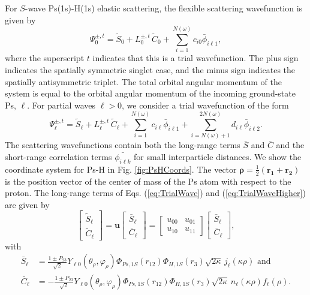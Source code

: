 \documentclass[preprint,showpacs,showkeys,preprintnumbers,amsmath,amssymb,longbibliography,pra,aps]{revtex4-1}
\begin{document}
For $S$-wave Ps(1s)-H(1s) elastic scattering, the flexible scattering
wavefunction is given by
\begin{equation}
\Psi_0^{\pm,t} = \widetilde{S}_0 + L_0^{\pm,t} \, \widetilde{C}_0
  + \sum_{i=1}^{N(\omega)} c_{i0} \bar{\phi}_{i\ell 1},
\label{eq:TrialWave}
\end{equation}
where the superscript $t$ indicates that this is a trial wavefunction. The plus
sign indicates the spatially symmetric singlet case, and the minus sign
indicates the spatially antisymmetric triplet. The total orbital angular
momentum of the system is equal to the orbital angular momentum of the incoming
ground-state Ps, $\ell$. For partial waves $\ell > 0$, we consider a trial
wavefunction of the form
\begin{equation}
\Psi_\ell^{\pm,t} = \widetilde{S}_\ell + L^{\pm,t}_\ell \, \widetilde{C}_\ell
 + \sum_{i=1}^{N(\omega)} c_{i\ell} \bar{\phi}_{i\ell 1}
 + \!\!\!\sum_{i=N(\omega)+1}^{2N(\omega)} \!\! d_{i\ell} \bar{\phi}_{i\ell 2}.
\label{eq:TrialWaveHigher}
\end{equation}
The scattering wavefunctions contain both the long-range terms $\bar{S}$ and
$\bar{C}$ and the short-range correlation terms $\bar{\phi_{i\ell k}}$ for
small interparticle distances. We show the coordinate system for Ps-H in 
Fig. \ref{fig:PsHCoords}. The vector
$\bm{\rho} = \frac{1}{2}\left(\bm{r_1} + \bm{r_2}\right)$ is the position
vector of the center of mass of the Ps atom with respect to the proton. The 
long-range terms of Eqs. (\ref{eq:TrialWave}) and (\ref{eq:TrialWaveHigher})
are given by
\begin{equation}
\label{eq:SCPhiDef}
\begin{bmatrix}
\widetilde{S}_\ell \\ \widetilde{C}_\ell
\end{bmatrix} = \textbf{u}  \begin{bmatrix}
\bar{S}_\ell \\ \bar{C}_\ell
\end{bmatrix} = \begin{bmatrix}
u_{00} & u_{01} \\  u_{10} & u_{11}
\end{bmatrix}
\begin{bmatrix}
\bar{S}_\ell \\ \bar{C}_\ell
\end{bmatrix}, 
\end{equation}
with
\begin{subequations}
\label{eq:SCBarPhiDef}
\begin{align}
\bar{S}_\ell &= \frac{1\pm P_{23}}{\sqrt{2}}Y_{\ell 0}(\theta_\rho,
  \varphi_\rho)\Phi_{Ps,1S}\left(r_{12}\right) \Phi_{H,1S}\left(r_3\right)
  \sqrt{2\kappa} \,j_\ell\left(\kappa\rho\right) \text{ and} \label{eq:SBar} \\
\bar{C}_\ell &= -\frac{1\pm P_{23}}{\sqrt{2}}Y_{\ell 0}(\theta_\rho,
  \varphi_\rho)\Phi_{Ps,1S}\left(r_{12}\right) \Phi_{H,1S}\left(r_3\right)
  \sqrt{2\kappa} \,n_\ell\left(\kappa\rho\right) f_\ell(\rho). \label{eq:CBar}
\end{align}
\end{subequations}
\end{document}
